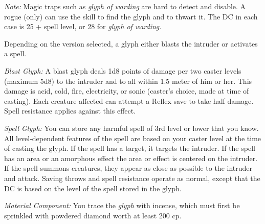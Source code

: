 {	\textit{Note:} Magic traps such as \emph{glyph of warding} are hard to detect and disable. A rogue (only) can use the  skill to find the glyph and  to thwart it. The DC in each case is 25 + spell level, or 28 for \emph{glyph of warding}.

	Depending on the version selected, a glyph either blasts the intruder or activates a spell.

	\textit{Blast Glyph:}
	A blast glyph deals 1d8 points of damage per two caster levels (maximum 5d8) to the intruder and to all within 1.5 meter of him or her. This damage is acid, cold, fire, electricity, or sonic (caster's choice, made at time of casting). Each creature affected can attempt a Reflex save to take half damage. Spell resistance applies against this effect.

	\textit{Spell Glyph:}
	You can store any harmful spell of 3rd level or lower that you know. All level-dependent features of the spell are based on your caster level at the time of casting the glyph. If the spell has a target, it targets the intruder. If the spell has an area or an amorphous effect the area or effect is centered on the intruder. If the spell summons creatures, they appear as close as possible to the intruder and attack. Saving throws and spell resistance operate as normal, except that the DC is based on the level of the spell stored in the glyph.

	\textit{Material Component:}
	You trace the \emph{glyph} with incense, which must first be sprinkled with powdered diamond worth at least 200 cp.

}

